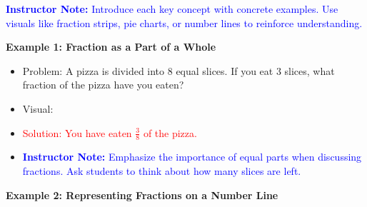 \documentclass[12pt]{article}
\begin{document}
\textcolor{blue}{\textbf{Instructor Note:} Introduce each key concept with concrete examples. Use visuals like fraction strips, pie charts, or number lines to reinforce understanding.}

\vspace{1em}






\begin{tcolorbox}[colframe=black!60, colback=white, 
coltitle=black, colbacktitle=black!15, fonttitle=\bfseries\Large, 
title=Examples with Solutions, halign title=center, left=10pt, right=10pt, top=10pt, bottom=15pt]
\textbf{Example 1: Fraction as a Part of a Whole}
\begin{itemize}
    \item Problem: A pizza is divided into 8 equal slices. If you eat 3 slices, what fraction of the pizza have you eaten?


 \item Visual:
    \begin{center}
    \end{center}


    \item \textcolor{red}{Solution: You have eaten \( \frac{3}{8} \) of the pizza.}
    \item \textcolor{blue}{\textbf{Instructor Note:} Emphasize the importance of equal parts when discussing fractions. Ask students to think about how many slices are left.}
\end{itemize}




\textbf{Example 2: Representing Fractions on a Number Line}



\end{tcolorbox}
\end{document}
